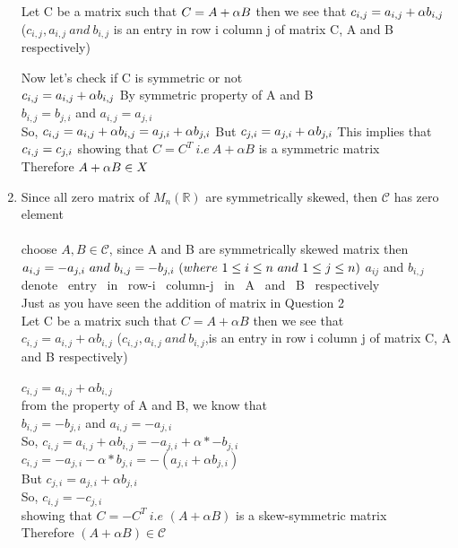 \documentclass[45pt]{article}
\begin{document}
\begin{enumerate}
Let C be a matrix such that 
$C= A+ \alpha B \\$ then we see that 
$c_{i,j}=a_{i,j}+\alpha b_{i,j} \\$
($ c_{i,j},a_{i,j}~ and ~b_{i,j} $ is an entry in row i column j of matrix C, A and B respectively)

Now let's check if C is symmetric or not\\
$c_{i,j}=a_{i,j}+\alpha b_{i,j}\\ $
By symmetric property of A and B\\ $b_{i,j}=b_{j,i}$ and $a_{i,j}=a_{j,i}$\\
So, $c_{i,j}=a_{i,j}+\alpha b_{i,j} =a_{j,i}+\alpha b_{j,i}\\$ 
But $c_{j,i} =a_{j,i}+\alpha b_{j,i}\\$
This implies that $c_{i,j}=c_{j,i}\\$
showing that $C=C^T ~i.e~ A+ \alpha B$ is a symmetric matrix \\
Therefore $A+ \alpha B  \in X\\$


\item Since all zero matrix of $M_n(\mathbb{R}) $ are symmetrically skewed, then $\mathcal{C}$  has zero element\\
 \\ 

choose $A, B \in \mathcal{C} $, since A and B are symmetrically skewed matrix then 
$ a_{i,j}=-a_{j,i} ~ and ~ b_{i,j}=-b_{j,i} ~ (where ~ 1 \leq i \leq n ~and ~1 \leq j \leq n )\\$
$a_{ij}$ and $b_{i,j}$~ denote~ entry~ in~ row-i ~column-j ~in ~A~ and ~B~ respectively\\

Just as you have seen the addition of matrix in Question 2\\
Let C be a matrix such that 
$C= A+ \alpha B $ then we see that \\
$c_{i,j}=a_{i,j}+\alpha b_{i,j} $
($ c_{i,j},a_{i,j}~ and ~b_{i,j} $,is an entry in row i column j of matrix C, A and B respectively)\\

\\
$c_{i,j}=a_{i,j}+\alpha b_{i,j} $\\
from the property of A and B, we know that \\
$b_{i,j}=-b_{j,i}$ and $a_{i,j}=-a_{j,i}$\\
So, $c_{i,j}=a_{i,j}+\alpha b_{i,j} =-a_{j,i}+\alpha *-b_{j,i}$\\
$c_{i,j}=-a_{j,i}-\alpha *b_{j,i}=-(a_{j,i}+\alpha b_{j,i})$ \\
But $c_{j,i} =a_{j,i}+\alpha b_{j,i}$\\
So, $c_{i,j}=-c_{j,i}$\\
showing that $C=-C^T ~i.e $ $ (A+ \alpha B)$ is a skew-symmetric  matrix \\
Therefore $(A+ \alpha B)  \in \mathcal{C}$\\



\end{enumerate}
\end{document}

